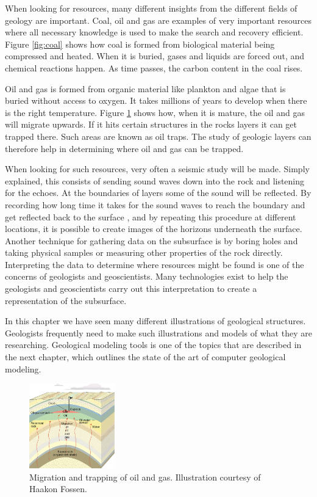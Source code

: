 \documentclass[a4paper,12pt]{report}
\begin{document}
When looking for resources, many different insights from the different fields of geology are important. Coal, oil and gas are examples of very important resources where all necessary knowledge is used to make the search and recovery efficient. Figure \ref{fig:coal} shows how coal is formed from biological material being compressed and heated. When it is buried, gases and liquids are forced out, and chemical reactions happen. As time passes, the carbon content in the coal rises.


Oil and gas is formed from organic material like plankton and algae that is buried without access to oxygen. It takes millions of years to develop when there is the right temperature. Figure \ref{fig:oilMigrate} shows how, when it is mature, the oil and gas will migrate upwards. If it hits certain structures in the rocks layers it can get trapped there. Such areas are known as oil traps. The study of geologic layers can therefore help in determining where oil and gas can be trapped.

When looking for such resources, very often a seismic study will be made. Simply explained, this consists of sending sound waves down into the rock and listening for the echoes. At the boundaries of layers some of the sound will be reflected. By recording how long time it takes for the sound waves to reach the boundary and get reflected back to the surface , and by repeating this procedure at different locations, it is possible to create images of the horizons underneath the surface. Another technique for gathering data on the subsurface is by boring holes and taking physical samples or 
measuring other properties of the rock directly. Interpreting the data to determine where resources might be found is one of the concerns of geologists and geoscientists. Many technologies exist to help the geologists and geoscientists carry out this interpretation to create a representation of the subsurface.

In this chapter we have seen many different illustrations of geological structures. Geologists frequently need to make such illustrations and models of what they are researching. Geological modeling tools is one of the topics that are described in the next chapter, which outlines the state of the art of computer geological modeling.
 \begin{figure}
  
\centering
    \includegraphics[width=0.33\textwidth]{thesis/geo/english/Antiformfelle.jpg}

  \caption{Migration and trapping of oil and gas. Illustration courtesy of Haakon Fossen.}
  \label{fig:oilMigrate}
 \end{figure}
\end{document}
